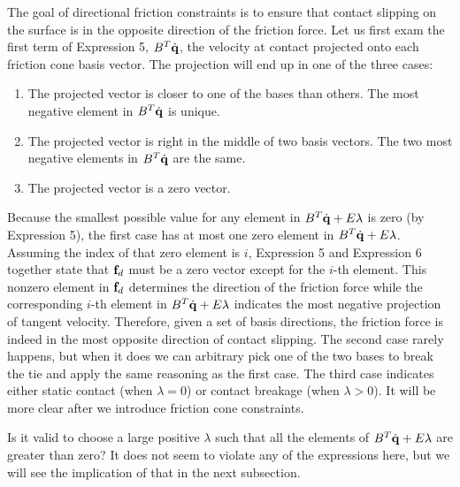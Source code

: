 The goal of directional friction constraints is to ensure that contact
slipping on the surface is in the opposite direction of the friction
force. Let us first exam the first term of Expression 5,
$B^T\dot{\mathbf{q}}$, the velocity at contact projected onto each friction
cone basis vector. The projection will end up in one of the three cases:
\begin{enumerate}
\item The projected vector is closer to one of the bases than others. The most
  negative element in $B^T\dot{\mathbf{q}}$ is unique.
\item The projected vector is right in the middle of two basis
  vectors. The two most negative elements in $B^T\dot{\mathbf{q}}$ are the
  same.
\item The projected vector is a zero vector.
\end{enumerate}
Because the smallest possible value for any element
in $B^T\dot{\mathbf{q}} + E\lambda$ is zero (by Expression 5), the first case has at most
one zero element in $B^T\dot{\mathbf{q}} + E\lambda$. Assuming the index
of that zero element is $i$, Expression 5 and Expression 6 together
state that $\mathbf{f}_d$ must be a zero vector except for the $i$-th
element. This nonzero element in $\mathbf{f}_d$ determines the direction
of the friction force while the corresponding $i$-th element in
$B^T\dot{\mathbf{q}} + E\lambda$ indicates the most negative projection of
tangent velocity. Therefore, given a set of basis directions, the
friction force is indeed in the most opposite direction of contact
slipping. The second case rarely happens, but when it does we can
arbitrary pick one of the two bases to break the tie and apply the
same reasoning as the first case. The third case indicates either
static contact (when $\lambda = 0$) or contact breakage (when $\lambda
> 0$). It will be more clear after we introduce friction cone
constraints.

Is it valid to choose a large positive $\lambda$ such that all the
elements of $B^T\dot{\mathbf{q}} + E\lambda$ are greater than zero? It
does not seem to violate any of the expressions here, but we will see
the implication of that in the next subsection.


